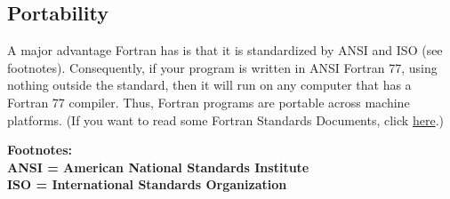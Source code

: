 \subsection*{Portability}

A major advantage Fortran has is that it is standardized by ANSI and ISO
(see footnotes). Consequently, if your program is written in ANSI
Fortran 77, using nothing outside the standard, then it will run on any
computer that has a Fortran 77 compiler. Thus, Fortran programs are
portable across machine platforms. (If you want to read some Fortran
Standards Documents, click
\href{http://www.fortran.com/fortran/stds_docs.html}{here}.)

\textbf{Footnotes: \\
ANSI = American National Standards Institute \\
ISO = International Standards Organization}

\footer
